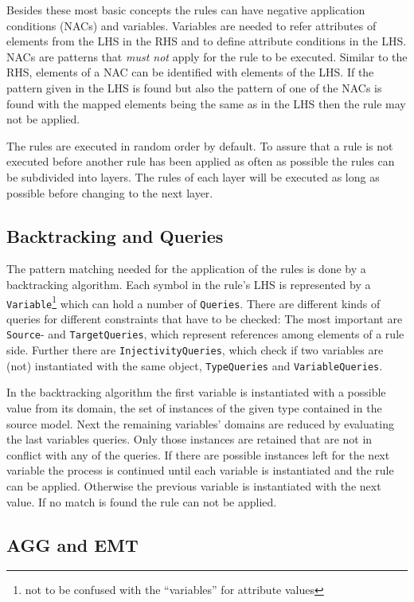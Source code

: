 Besides these most basic concepts the rules can have negative application conditions (NACs) and variables. Variables are needed to refer attributes of elements from the LHS in the RHS and to define attribute conditions in the LHS. NACs are patterns that \emph{must not} apply for the rule to be executed. Similar to the RHS, elements of a NAC can be identified with elements of the LHS. If the pattern given in the LHS is found but also the pattern of one of the NACs is found with the mapped elements being the same as in the LHS then the rule may not be applied.

The rules are executed in random order by default. To assure that a rule is not executed before another rule has been applied as often as possible the rules can be subdivided into layers. The rules of each layer will be executed as long as possible before changing to the next layer.


\subsection{Backtracking and Queries}

The pattern matching needed for the application of the rules is done by a backtracking algorithm. Each symbol in the rule's LHS is represented by a \verb|Variable|\footnote{not to be confused with the ``variables'' for attribute values} which can hold a number of \verb|Queries|. There are different kinds of queries for different constraints that have to be checked: The most important are \verb|Source|- and \verb|TargetQueries|, which represent references among elements of a rule side. Further there are \verb|InjectivityQueries|, which check if two variables are (not) instantiated with the same object, \verb|TypeQueries| and \verb|VariableQueries|.

In the backtracking algorithm the first variable is instantiated with a possible value from its domain, the set of instances of the given type contained in the source model. Next the remaining variables' domains are reduced by evaluating the last variables queries. Only those instances are retained that are not in conflict with any of the queries. If there are possible instances left for the next variable the process is continued until each variable is instantiated and the rule can be applied. Otherwise the previous variable is instantiated with the next value. If no match is found the rule can not be applied.


\subsection{AGG and EMT}

